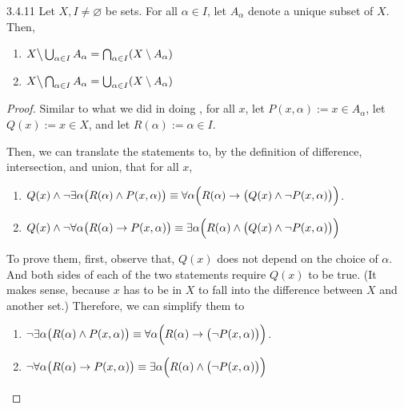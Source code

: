 \begin{exercise}{3.4.11}
	Let $X, I \ne \varnothing$ be sets. For all $\alpha \in I$, let $A_\alpha$ denote a unique subset of $X$. Then,
	\begin{enumerate}
		\item $X \big\backslash\bigcup_{\alpha \in I} A_\alpha = \bigcap_{\alpha\in I}(X \setminus A_\alpha)$
		\item $X \big\backslash\bigcap_{\alpha \in I} A_\alpha = \bigcup_{\alpha\in I}(X \setminus A_\alpha)$
	\end{enumerate}
\end{exercise}
\begin{proof}
	Similar to what we did in doing , for all $x$, let $P(x,\alpha) := x \in A_\alpha$, let $Q(x) := x \in X$, and let $R(\alpha) := \alpha \in I$.
	
	Then, we can translate the statements to, by the definition of difference, intersection, and union, that for all $x$,
	\begin{enumerate}
		\item $Q(x) \wedge \neg \exists\alpha\bigl(R(\alpha) \wedge P(x,\alpha)\bigr) \equiv \forall\alpha\Bigl(R(\alpha) \to \bigl(Q(x) \wedge \neg P(x,\alpha)\bigr)\Bigr)$.
		\item $Q(x) \wedge \neg \forall\alpha\bigl(R(\alpha) \to P(x,\alpha)\bigr) \equiv \exists\alpha\Bigl(R(\alpha) \wedge \bigl(Q(x) \wedge \neg P(x,\alpha)\bigr)\Bigr)$
	\end{enumerate}

	To prove them, first, observe that, $Q(x)$ does not depend on the choice of $\alpha$. And both sides of each of the two statements require $Q(x)$ to be true. (It makes sense, because $x$ has to be in $X$ to fall into the difference between $X$ and another set.) Therefore, we can simplify them to
	\begin{enumerate}
		\item $\neg \exists\alpha\bigl(R(\alpha) \wedge P(x,\alpha)\bigr) \equiv \forall\alpha\Bigl(R(\alpha) \to \bigl(\neg P(x,\alpha)\bigr)\Bigr)$.
		\item $\neg \forall\alpha\bigl(R(\alpha) \to P(x,\alpha)\bigr) \equiv \exists\alpha\Bigl(R(\alpha) \wedge \bigl(\neg P(x,\alpha)\bigr)\Bigr)$
	\end{enumerate}


\end{proof}

